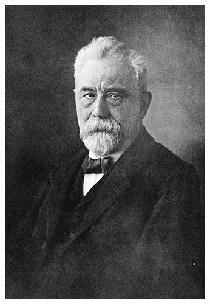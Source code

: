 \begin{frame}[fragile]
\begin{minipage}[t]{0.42\textwidth}
   \includegraphics[width=\textwidth,keepaspectratio]{Lexis-portrait}
  \end{minipage}
\end{frame}

